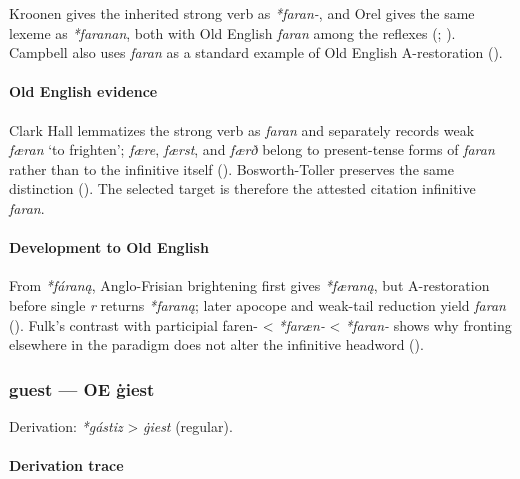 \documentclass[
  british,
  a4paper,
]{article}
\begin{document}
Kroonen gives the inherited strong verb as \emph{*faran-}, and Orel
gives the same lexeme as \emph{*faranan}, both with Old English
\emph{faran} among the reflexes (; ). Campbell also uses
\emph{faran} as a standard example of Old English A-restoration
().

\paragraph{Old English evidence}\label{old-english-evidence-5}

Clark Hall lemmatizes the strong verb as \emph{faran} and separately
records weak \emph{færan} `to frighten'; \emph{fære}, \emph{færst}, and
\emph{færð} belong to present-tense forms of \emph{faran} rather than to
the infinitive itself ().
Bosworth-Toller preserves the same distinction
(). The
selected target is therefore the attested citation infinitive
\emph{faran}.

\paragraph{Development to Old
English}\label{development-to-old-english-5}

From \emph{*fáraną}, Anglo-Frisian brightening first gives
\emph{*færaną}, but A-restoration before single \emph{r} returns
\emph{*faraną}; later apocope and weak-tail reduction yield \emph{faran}
(). Fulk's contrast with
participial faren- \textless{} \emph{*faræn-} \textless{} \emph{*faran-}
shows why fronting elsewhere in the paradigm does not alter the
infinitive headword ().

\subsubsection{guest --- OE ġiest}\label{guest-oe-ux121iest}

Derivation: \emph{*gástiz} \textgreater{} \emph{ġiest} (regular).

\paragraph{Derivation trace}\label{derivation-trace-6}
\end{document}

